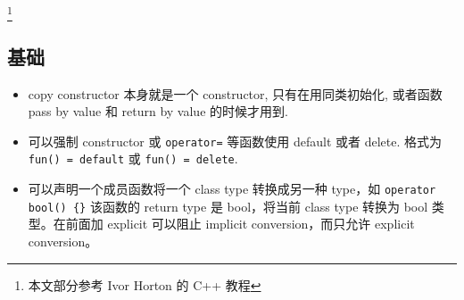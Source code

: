 
\begin{issues}
\issueDraft
\end{issues}

\footnote{本文部分参考 Ivor Horton 的 C++ 教程}

\subsection{基础}
\begin{itemize}
\item copy constructor 本身就是一个 constructor, 只有在用同类初始化, 或者函数 pass by value 和 return by value 的时候才用到.
\item 可以强制 constructor 或 \verb|operator=| 等函数使用 default 或者 delete. 格式为 \verb|fun() = default| 或 \verb|fun() = delete|.
\item 可以声明一个成员函数将一个 class type 转换成另一种 type，如 \verb|operator bool() {}| 该函数的 return type 是 bool，将当前 class type 转换为 bool 类型。在前面加 explicit 可以阻止 implicit conversion，而只允许 explicit conversion。
\end{itemize}

